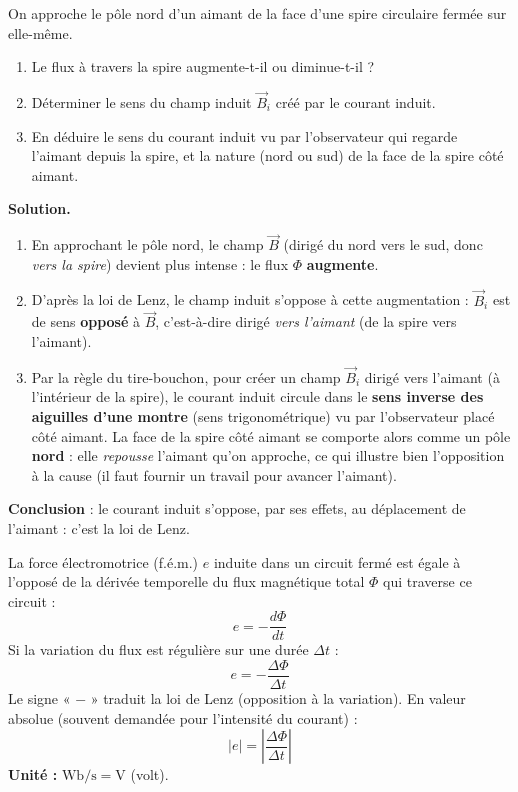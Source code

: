 \documentclass[11pt]{article}
\newcounter{popsec}
\newcounter{popsub}
\newcommand{\courssub}[1]{%
  \stepcounter{popsub}%
  \par\vspace{9pt}\noindent{\popxbold\fontsize{11.5}{13}\selectfont\color{popink}{\color{poporange}\thepopsec.\thepopsub}\hspace{6pt}#1}\par\nopagebreak\vspace{4pt}
}
\begin{document}
\begin{exoresolu}
On approche le pôle nord d'un aimant de la face d'une spire circulaire fermée sur elle-même.
\begin{enumerate}
\item Le flux à travers la spire augmente-t-il ou diminue-t-il ?
\item Déterminer le sens du champ induit $\vec{B}_i$ créé par le courant induit.
\item En déduire le sens du courant induit vu par l'observateur qui regarde l'aimant depuis la spire, et la nature (nord ou sud) de la face de la spire côté aimant.
\end{enumerate}
\tcblower
\textbf{Solution.}
\begin{enumerate}
\item En approchant le pôle nord, le champ $\vec{B}$ (dirigé du nord vers le sud, donc \emph{vers la spire}) devient plus intense : le flux $\Phi$ \textbf{augmente}.
\item D'après la loi de Lenz, le champ induit s'oppose à cette augmentation : $\vec{B}_i$ est de sens \textbf{opposé} à $\vec{B}$, c'est-à-dire dirigé \emph{vers l'aimant} (de la spire vers l'aimant).
\item Par la règle du tire-bouchon, pour créer un champ $\vec{B}_i$ dirigé vers l'aimant (à l'intérieur de la spire), le courant induit circule dans le \textbf{sens inverse des aiguilles d'une montre} (sens trigonométrique) vu par l'observateur placé côté aimant. La face de la spire côté aimant se comporte alors comme un pôle \textbf{nord} : elle \emph{repousse} l'aimant qu'on approche, ce qui illustre bien l'opposition à la cause (il faut fournir un travail pour avancer l'aimant).
\end{enumerate}
\textbf{Conclusion} : le courant induit s'oppose, par ses effets, au déplacement de l'aimant : c'est la loi de Lenz.
\end{exoresolu}

\courssub{F.é.m. induite : loi de Faraday}

\begin{propriete}
La force électromotrice (f.é.m.) $e$ induite dans un circuit fermé est égale à l'opposé de la dérivée temporelle du flux magnétique total $\Phi$ qui traverse ce circuit :
\[ e = -\dfrac{d\Phi}{dt} \]
Si la variation du flux est régulière sur une durée $\Delta t$ :
\[ e = -\dfrac{\Delta\Phi}{\Delta t} \]
Le signe « $-$ » traduit la loi de Lenz (opposition à la variation). En valeur absolue (souvent demandée pour l'intensité du courant) :
\[ |e| = \left|\dfrac{\Delta\Phi}{\Delta t}\right| \]
\textbf{Unité :} $\mathrm{Wb}/\mathrm{s} = \mathrm{V}$ (volt).
\end{propriete}
\end{document}
